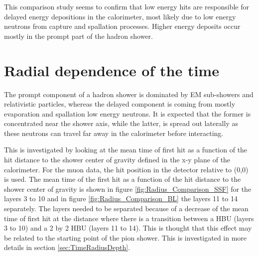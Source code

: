 This comparison study seems to confirm that low energy hits are responsible for delayed energy depositions in the calorimeter, most likely due to low energy neutrons from capture and spallation processes. Higher energy deposits occur mostly in the prompt part of the hadron shower.

\section{Radial dependence of the time}
\label{sec:RadialTime}

The prompt component of a hadron shower is dominated by EM sub-showers and relativistic particles, whereas the delayed component is coming from mostly evaporation and spallation low energy neutrons. It is expected that the former is concentrated near the shower axis, while the latter, is spread out laterally as these neutrons can travel far away in the calorimeter before interacting.

This is investigated by looking at the mean time of first hit as a function of the hit distance to the shower center of gravity defined in the x-y plane of the calorimeter. For the muon data, the hit position in the detector relative to (0,0) is used. The mean time of the first hit as a function of the hit distance to the shower center of gravity is shown in figure \ref{fig:Radius_Comparison_SSF} for the layers 3 to 10 and in figure \ref{fig:Radius_Comparison_BL} the layers 11 to 14 separately. The layers needed to be separated because of a decrease of the mean time of first hit at the distance where there is a transition between a HBU (layers 3 to 10) and a 2 by 2 HBU (layers 11 to 14). This is thought that this effect may be related to the starting point of the pion shower. This is investigated in more details in section \ref{sec:TimeRadiusDepth}.


